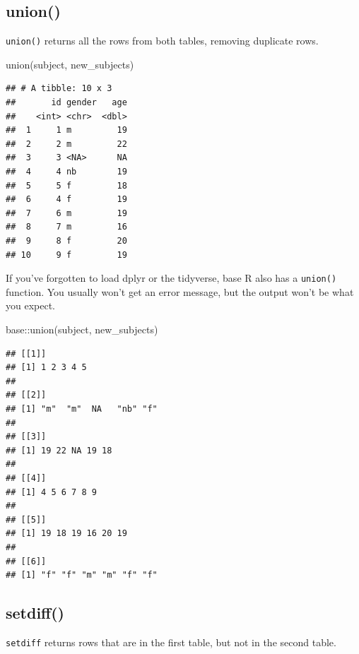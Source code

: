 \documentclass[
  oneside]{book}
\newenvironment{Shaded}{\begin{snugshade}}{\end{snugshade}}
\newcommand{\FunctionTok}[1]{\textcolor[rgb]{0.00,0.00,0.00}{#1}}
\newcommand{\NormalTok}[1]{#1}
\newcommand{\SpecialCharTok}[1]{\textcolor[rgb]{0.00,0.00,0.00}{#1}}
\begin{document}
\hypertarget{union}{%
\subsection{union()}\label{union}}

\texttt{union()} returns all the rows from both tables, removing duplicate rows.

\begin{Shaded}
\begin{Highlighting}[]
\FunctionTok{union}\NormalTok{(subject, new\_subjects)}
\end{Highlighting}
\end{Shaded}

\begin{verbatim}
## # A tibble: 10 x 3
##       id gender   age
##    <int> <chr>  <dbl>
##  1     1 m         19
##  2     2 m         22
##  3     3 <NA>      NA
##  4     4 nb        19
##  5     5 f         18
##  6     4 f         19
##  7     6 m         19
##  8     7 m         16
##  9     8 f         20
## 10     9 f         19
\end{verbatim}

\begin{warning}

If you've forgotten to load dplyr or the tidyverse, base R also has a \texttt{union()} function. You usually won't get an error message, but the output won't be what you expect.

\begin{Shaded}
\begin{Highlighting}[]
\NormalTok{base}\SpecialCharTok{::}\FunctionTok{union}\NormalTok{(subject, new\_subjects)}
\end{Highlighting}
\end{Shaded}

\begin{verbatim}
## [[1]]
## [1] 1 2 3 4 5
## 
## [[2]]
## [1] "m"  "m"  NA   "nb" "f" 
## 
## [[3]]
## [1] 19 22 NA 19 18
## 
## [[4]]
## [1] 4 5 6 7 8 9
## 
## [[5]]
## [1] 19 18 19 16 20 19
## 
## [[6]]
## [1] "f" "f" "m" "m" "f" "f"
\end{verbatim}

\end{warning}

\hypertarget{setdiff}{%
\subsection{setdiff()}\label{setdiff}}

\texttt{setdiff} returns rows that are in the first table, but not in the second table.
\end{document}

